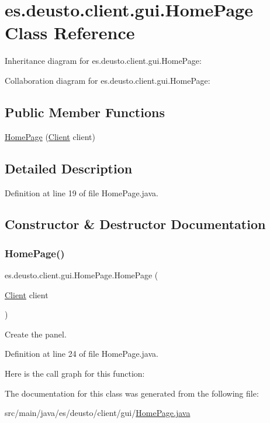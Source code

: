 \hypertarget{classes_1_1deusto_1_1client_1_1gui_1_1_home_page}{}\section{es.\+deusto.\+client.\+gui.\+Home\+Page Class Reference}
\label{classes_1_1deusto_1_1client_1_1gui_1_1_home_page}


Inheritance diagram for es.\+deusto.\+client.\+gui.\+Home\+Page\+:


Collaboration diagram for es.\+deusto.\+client.\+gui.\+Home\+Page\+:
\subsection*{Public Member Functions}
\begin{DoxyCompactItemize}
\item 
\mbox{\hyperlink{classes_1_1deusto_1_1client_1_1gui_1_1_home_page_ada47f27769156f1d11578e12e651beed}{Home\+Page}} (\mbox{\hyperlink{classes_1_1deusto_1_1client_1_1_client}{Client}} client)
\end{DoxyCompactItemize}


\subsection{Detailed Description}


Definition at line 19 of file Home\+Page.\+java.



\subsection{Constructor \& Destructor Documentation}
\mbox{\label{classes_1_1deusto_1_1client_1_1gui_1_1_home_page_ada47f27769156f1d11578e12e651beed}} 
\subsubsection{\texorpdfstring{HomePage()}{HomePage()}}
{\footnotesize\ttfamily es.\+deusto.\+client.\+gui.\+Home\+Page.\+Home\+Page (\begin{DoxyParamCaption}\item[{\mbox{\hyperlink{classes_1_1deusto_1_1client_1_1_client}{Client}}}]{client }\end{DoxyParamCaption})}

Create the panel. 

Definition at line 24 of file Home\+Page.\+java.

Here is the call graph for this function\+:


The documentation for this class was generated from the following file\+:\begin{DoxyCompactItemize}
\item 
src/main/java/es/deusto/client/gui/\mbox{\hyperlink{_home_page_8java}{Home\+Page.\+java}}\end{DoxyCompactItemize}
